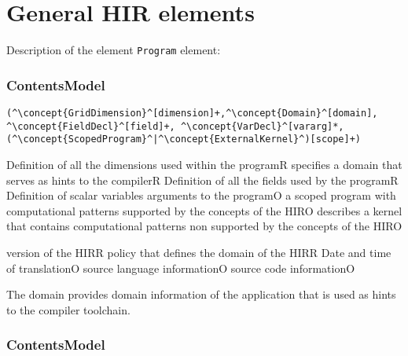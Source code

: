 \section{General HIR elements}


Description of the element {\tt Program} element:

\subsubsection*{ContentsModel}{}

\begin{lstlisting}[style=default]
(^\concept{GridDimension}^[dimension]+,^\concept{Domain}^[domain], ^\concept{FieldDecl}^[field]+, ^\concept{VarDecl}^[vararg]*, (^\concept{ScopedProgram}^|^\concept{ExternalKernel}^)[scope]+)
\end{lstlisting}

\begin{HIRChildElements}
{Definition of all the dimensions used within the program}{R}
{specifies a domain that serves as hints to the compiler}{R}
{Definition of all the fields used by the program}{R}
{Definition of scalar variables arguments to the program}{O}
{a scoped program with computational patterns supported by the concepts of the HIR}{O}
{describes a kernel that contains computational patterns non supported by the concepts of the HIR}{O}
\end{HIRChildElements}

\begin{HIRAttributes}
{version of the HIR}{R}
{policy that defines the domain of the HIR}{R}
{Date and time of translation}{O}
{source language information}{O}
{source code information}{O}
\end{HIRAttributes}


The domain provides domain information of the application that is used as hints to the compiler toolchain.

\subsubsection*{ContentsModel}{}

